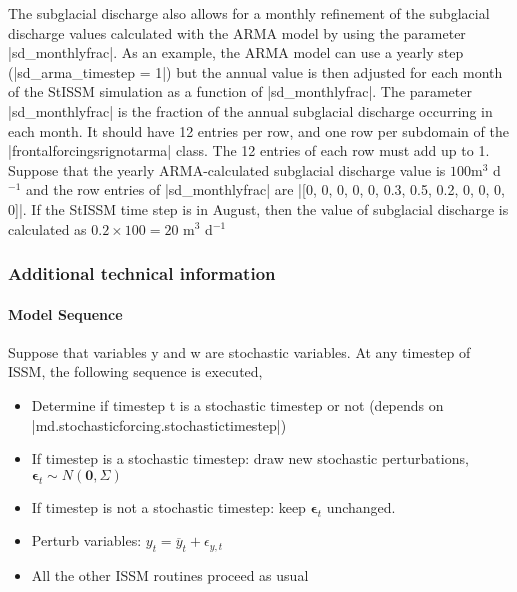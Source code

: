 The subglacial discharge also allows for a monthly refinement of the subglacial discharge values calculated with the ARMA model by using the parameter \lstinlinebg|sd_monthlyfrac|. As an example, the ARMA model can use a yearly step (\lstinlinebg|sd_arma_timestep = 1|) but the annual value is then adjusted for each month of the StISSM simulation as a function of \lstinlinebg|sd_monthlyfrac|. The parameter \lstinlinebg|sd_monthlyfrac| is the fraction of the annual subglacial discharge occurring in each month. It should have 12 entries per row, and one row per subdomain of the \lstinlinebg|frontalforcingsrignotarma| class. The 12 entries of each row must add up to 1. Suppose that the yearly ARMA-calculated subglacial discharge value is $100$m$^{3}$ d$^{-1}$ and the row entries of \lstinlinebg|sd_monthlyfrac| are \lstinlinebg|[0, 0, 0, 0, 0, 0.3, 0.5, 0.2, 0, 0, 0, 0]|. If the StISSM time step is in August, then the value of subglacial discharge is calculated as
$0.2\times 100 = 20$ m$^{3}$ d$^{-1}$

\subsubsection{Additional technical information}
\paragraph{Model Sequence}
Suppose that variables y and w are stochastic variables. At any timestep of ISSM, the following sequence is executed,
\begin{itemize}
	\item Determine if timestep t is a stochastic timestep or not (depends on \lstinlinebg|md.stochasticforcing.stochastictimestep|)
	\item If timestep is a stochastic timestep: draw new stochastic perturbations,
		$\boldsymbol{\epsilon}_{t} \sim N(\boldsymbol{0},\Sigma)$
	\item If timestep is not a stochastic timestep: keep $\boldsymbol{\epsilon}_{t}$ unchanged.
	\item Perturb variables: $y_{t} = \overline{y}_{t}+\epsilon_{y,t}$
	\item All the other ISSM routines proceed as usual
\end{itemize}


